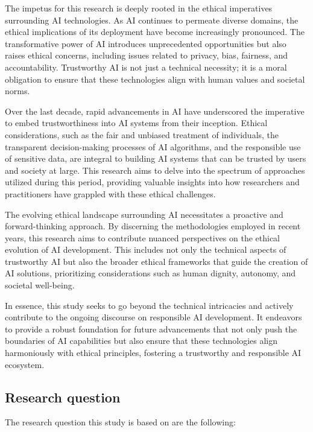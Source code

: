 \documentclass{article}
\begin{document}
The impetus for this research is deeply rooted in the ethical imperatives surrounding AI technologies. As AI continues to permeate diverse domains, the ethical implications of its deployment have become increasingly pronounced. The transformative power of AI introduces unprecedented opportunities but also raises ethical concerns, including issues related to privacy, bias, fairness, and accountability. Trustworthy AI is not just a technical necessity; it is a moral obligation to ensure that these technologies align with human values and societal norms.

Over the last decade, rapid advancements in AI have underscored the imperative to embed trustworthiness into AI systems from their inception. Ethical considerations, such as the fair and unbiased treatment of individuals, the transparent decision-making processes of AI algorithms, and the responsible use of sensitive data, are integral to building AI systems that can be trusted by users and society at large. This research aims to delve into the spectrum of approaches utilized during this period, providing valuable insights into how researchers and practitioners have grappled with these ethical challenges.

The evolving ethical landscape surrounding AI necessitates a proactive and forward-thinking approach. By discerning the methodologies employed in recent years, this research aims to contribute nuanced perspectives on the ethical evolution of AI development. This includes not only the technical aspects of trustworthy AI but also the broader ethical frameworks that guide the creation of AI solutions, prioritizing considerations such as human dignity, autonomy, and societal well-being.

In essence, this study seeks to go beyond the technical intricacies and actively contribute to the ongoing discourse on responsible AI development. It endeavors to provide a robust foundation for future advancements that not only push the boundaries of AI capabilities but also ensure that these technologies align harmoniously with ethical principles, fostering a trustworthy and responsible AI ecosystem.

\subsection{Research question}

The research question this study is based on are the following:
\end{document}
